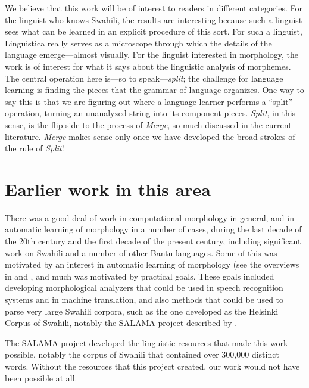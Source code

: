 \documentclass[output=paper,colorlinks,citecolor=brown,
]{langscibook}
\begin{document}
We believe that this work will be of interest to readers in different categories. For the linguist who knows Swahili, the results are interesting because such a linguist sees what can be learned in an explicit procedure of this sort. For such a linguist, Linguistica really serves as a microscope through which the details of the language emerge---almost visually. For the linguist interested in morphology, the work is of interest for what it says about the linguistic analysis of morphemes. The central operation here is---so to speak---\textit{split}; the challenge for language learning is finding the pieces that the grammar of language organizes. One way to say this is that we are figuring out where a language-learner performs a ``split'' operation, turning an unanalyzed string into its component pieces. \textit{Split}, in this sense, is the flip-side to the process of \textit{Merge}, so much discussed in the current literature. \textit{Merge} makes sense only once we have developed the broad strokes of the rule of \textit{Split}!


\section{Earlier work in this area}

There was a good deal of work in computational morphology in general, and in automatic learning of morphology in a number of cases, during the last decade of the 20th century and the first decade of the present century, including significant work on Swahili and a number of other Bantu languages. Some of this was motivated by an interest in automatic learning of morphology (see the overviews in \cite{Goldsmith201014} and \cite{GoldsmithEtAl2017}, and much was motivated by practical goals. These goals included developing morphological analyzers that could be used in speech recognition systems and in machine translation, and also methods that could be used to parse very large Swahili corpora, such as the one developed as the Helsinki Corpus of Swahili, notably the SALAMA project described by \cite{Hurskainen1992, Hurskainen1999, Hurskainen2004Compilers}. 

The SALAMA project developed the linguistic resources that made this work possible, notably the corpus of Swahili that contained over 300,000 distinct words. Without the resources that this project created, our work would not have been possible at all. 
\end{document}
